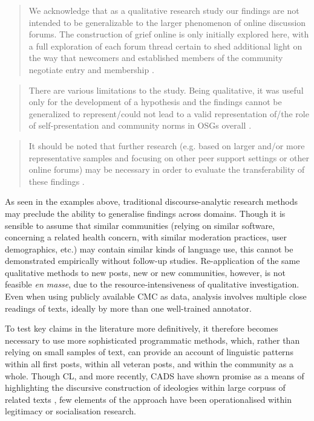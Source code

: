 \begin{quote}\singlespacing\small
We acknowledge that as a qualitative research study our findings are not intended to be generalizable to the larger phenomenon of online discussion forums. The construction of grief online is only initially explored here, with a full exploration of each forum thread certain to shed additional light on the way that newcomers and established \glspl{member} of the community negotiate entry and membership \cite[p.~8]{varga2014grieving}.
\end{quote}

\begin{quote}\singlespacing\small
There are various limitations to the study. Being qualitative, it was useful only for the development of a hypothesis and the findings cannot be generalized to represent\slash could not lead to a valid representation of\slash the role of self-presentation and community norms in OSGs overall \cite[p.~8]{stommel_use_2011}.
\end{quote}

\begin{quote}\small\singlespacing
It should be noted that further research (e.g. based on larger and\slash or more representative samples and focusing on other peer support settings or other online forums) may be necessary in order to evaluate the transferability of these findings \cite[p.~14]{kaufman2016producing}.
\end{quote}
%
As seen in the examples above, traditional discourse\hyp{}analytic research methods may preclude the ability to generalise findings across domains. Though it is sensible to assume that similar communities (relying on similar software, concerning a related health concern, with similar moderation practices, user demographics, etc.) may contain similar kinds of language use, this cannot be demonstrated empirically without follow\hyp{}up studies. Re\hyp{}application of the same qualitative methods to new \glspl{post}, new  or new communities, however, is not feasible \emph{en masse}, due to the resource\hyp{}intensiveness of qualitative investigation. Even when using publicly available \gls{CMC} as data, analysis involves multiple close readings of texts, ideally by more than one well\hyp{}trained annotator. 

To test key claims in the literature more definitively, it therefore becomes necessary to use more sophisticated programmatic methods, which, rather than relying on small samples of text, can provide an account of linguistic patterns within all first \glspl{post}, within all veteran \glspl{post}, and within the community as a whole. Though \gls{CL}, and more recently, \gls{CADS} have shown promise as a means of highlighting the discursive construction of ideologies within large \glspl{corpus} of related texts \cite[e.g.][]{koteyko_climate_2013,salama_ideological_2011}, few elements of the approach have been operationalised within legitimacy or socialisation research.

